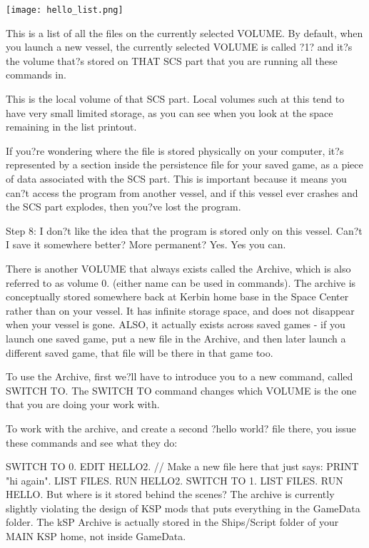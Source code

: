 \texttt{[image: hello\_list.png]}

This is a list of all the files on the currently selected VOLUME. By default, when you launch a new vessel, the currently selected VOLUME is called ?1? and it?s the volume that?s stored on THAT SCS part that you are running all these commands in.

This is the local volume of that SCS part. Local volumes such at this tend to have very small limited storage, as you can see when you look at the space remaining in the list printout.

If you?re wondering where the file is stored physically on your computer, it?s represented by a section inside the persistence file for your saved game, as a piece of data associated with the SCS part. This is important because it means you can?t access the program from another vessel, and if this vessel ever crashes and the SCS part explodes, then you?ve lost the program.

Step 8: I don?t like the idea that the program is stored only on this vessel. Can?t I save it somewhere better? More permanent?
Yes. Yes you can.

There is another VOLUME that always exists called the Archive, which is also referred to as volume 0. (either name can be used in commands). The archive is conceptually stored somewhere back at Kerbin home base in the Space Center rather than on your vessel. It has infinite storage space, and does not disappear when your vessel is gone. ALSO, it actually exists across saved games - if you launch one saved game, put a new file in the Archive, and then later launch a different saved game, that file will be there in that game too.

To use the Archive, first we?ll have to introduce you to a new command, called SWITCH TO. The SWITCH TO command changes which VOLUME is the one that you are doing your work with.

To work with the archive, and create a second ?hello world? file there, you issue these commands and see what they do:

SWITCH TO 0.
EDIT HELLO2. // Make a new file here that just says: PRINT "hi again".
LIST FILES.
RUN HELLO2.
SWITCH TO 1.
LIST FILES.
RUN HELLO.
But where is it stored behind the scenes? The archive is currently slightly violating the design of KSP mods that puts everything in the GameData folder. The kSP Archive is actually stored in the Ships/Script folder of your MAIN KSP home, not inside GameData.

